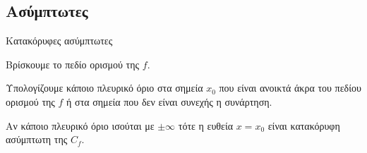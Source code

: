 \subsection{Ασύμπτωτες}
\begin{askhsh}{Κατακόρυφες ασύμπτωτες}
\bhmata\begin{bhma}
\item Βρίσκουμε το πεδίο ορισμού της $ f $.
\item Υπολογίζουμε κάποιο πλευρικό όριο στα σημεία $ x_0 $ που είναι ανοικτά άκρα του πεδίου ορισμού της $ f $ ή στα σημεία που δεν είναι συνεχής η συνάρτηση.
\item Αν κάποιο πλευρικό όριο ισούται με $ \pm\infty $ τότε η ευθεία $ x=x_0 $ είναι κατακόρυφη ασύμπτωτη της $ C_f $.
\end{bhma}
\end{askhsh}

